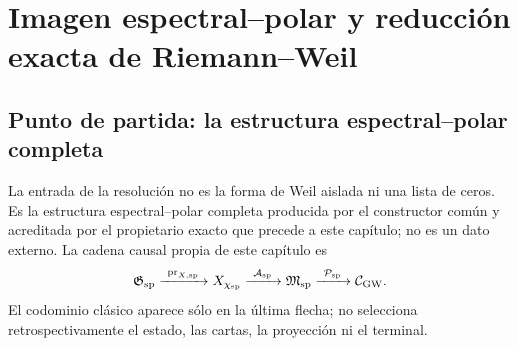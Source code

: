 \chapter{Imagen espectral--polar y reducción exacta de Riemann--Weil}

\section{Punto de partida: la estructura espectral--polar completa}

La entrada de la resolución no es la forma de Weil aislada ni una lista de
ceros. Es la estructura espectral--polar completa producida por el constructor
común y acreditada por el propietario exacto que precede a este capítulo; no es
un dato externo. La cadena causal propia de este capítulo es
\begin{equation}\label{eq:pdf2-rh-cadena-procedencia}
 \mathfrak G_{\rm sp}
 \xrightarrow{\ \operatorname{pr}_{X,{\rm sp}}\ }X_{\chi_{\rm sp}}
 \xrightarrow{\ \mathcal A_{\rm sp}\ }\mathfrak M_{\rm sp}
 \xrightarrow{\ \mathcal P_{\rm sp}\ }\mathcal C_{\rm GW}.
\end{equation}
El codominio clásico aparece sólo en la última flecha; no selecciona
retrospectivamente el estado, las cartas, la proyección ni el terminal.

